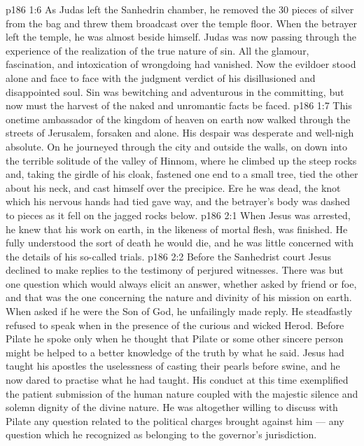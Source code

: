 \vs p186 1:6 As Judas left the Sanhedrin chamber, he removed the 30 pieces of silver from the bag and threw them broadcast over the temple floor. When the betrayer left the temple, he was almost beside himself. Judas was now passing through the experience of the realization of the true nature of sin. All the glamour, fascination, and intoxication of wrongdoing had vanished. Now the evildoer stood alone and face to face with the judgment verdict of his disillusioned and disappointed soul. Sin was bewitching and adventurous in the committing, but now must the harvest of the naked and unromantic facts be faced.
\vs p186 1:7 This onetime ambassador of the kingdom of heaven on earth now walked through the streets of Jerusalem, forsaken and alone. His despair was desperate and well\hyp{}nigh absolute. On he journeyed through the city and outside the walls, on down into the terrible solitude of the valley of Hinnom, where he climbed up the steep rocks and, taking the girdle of his cloak, fastened one end to a small tree, tied the other about his neck, and cast himself over the precipice. Ere he was dead, the knot which his nervous hands had tied gave way, and the betrayer’s body was dashed to pieces as it fell on the jagged rocks below.
\vs p186 2:1 When Jesus was arrested, he knew that his work on earth, in the likeness of mortal flesh, was finished. He fully understood the sort of death he would die, and he was little concerned with the details of his so\hyp{}called trials.
\vs p186 2:2 Before the Sanhedrist court Jesus declined to make replies to the testimony of perjured witnesses. There was but one question which would always elicit an answer, whether asked by friend or foe, and that was the one concerning the nature and divinity of his mission on earth. When asked if he were the Son of God, he unfailingly made reply. He steadfastly refused to speak when in the presence of the curious and wicked Herod. Before Pilate he spoke only when he thought that Pilate or some other sincere person might be helped to a better knowledge of the truth by what he said. Jesus had taught his apostles the uselessness of casting their pearls before swine, and he now dared to practise what he had taught. His conduct at this time exemplified the patient submission of the human nature coupled with the majestic silence and solemn dignity of the divine nature. He was altogether willing to discuss with Pilate any question related to the political charges brought against him --- any question which he recognized as belonging to the governor’s jurisdiction.
